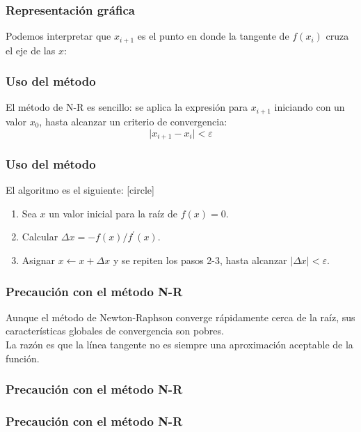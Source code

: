 \begin{frame}[fragile]
\frametitle{Representación gráfica}
Podemos interpretar que $x_{i+1}$ es el punto en donde la tangente de $f(x_{i})$ cruza el eje de las $x$:
\begin{figure}
	\centering
	
\end{figure}
\end{frame}
\begin{frame}[fragile]
\frametitle{Uso del método}
El método de N-R es sencillo: se aplica la expresión para $x_{i + 1}$ iniciando con un valor $x_{0}$, hasta alcanzar un criterio de convergencia:
\[ \vert x_{i+1} - x_{i} \vert < \varepsilon \]
\end{frame}
\begin{frame}[fragile]
\frametitle{Uso del método}
El algoritmo es el siguiente:
[circle]
\begin{enumerate}[<+->]
\item Sea $x$ un valor inicial para la raíz de $f(x)=0$.
\item Calcular $\Delta x = - f(x)/f^{\prime}(x)$.
\item Asignar $x \leftarrow x + \Delta x$ y se repiten los pasos 2-3, hasta alcanzar $\vert \Delta x \vert < \varepsilon$.
\end{enumerate}
\end{frame}
\begin{frame}[fragile]
\frametitle{Precaución con el método N-R}
Aunque el método de Newton-Raphson converge rápidamente cerca de la raíz, sus características globales de convergencia son pobres. 
\\
\bigskip
La razón es que la línea tangente no es siempre una aproximación aceptable de la función.
\end{frame}
\begin{frame}[fragile]
\frametitle{Precaución con el método N-R}
\begin{figure}
	\centering
	
\end{figure}
\end{frame}
\begin{frame}[fragile]
\frametitle{Precaución con el método N-R}
\begin{figure}
	\centering
	
\end{figure}
\end{frame}
